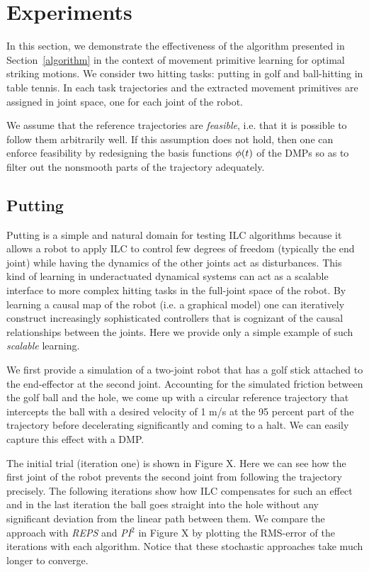 \section{Experiments}\label{experiments}

In this section, we demonstrate the effectiveness of the algorithm presented in Section~\ref{algorithm} in the context of movement primitive learning for optimal striking motions. We consider two hitting tasks: putting in golf and ball-hitting in table tennis. In each task trajectories and the extracted movement primitives are assigned in joint space, one for each joint of the robot. 

We assume that the reference trajectories are \emph{feasible}, i.e. that it is possible to follow them arbitrarily well. If this assumption does not hold, then one can enforce feasibility by redesigning the basis functions $\phi(t)$ of the DMPs so as to filter out the nonsmooth parts of the trajectory adequately.

\subsection{Putting}

Putting is a simple and natural domain for testing ILC algorithms because it allows a robot to apply ILC to control few degrees of freedom (typically the end joint) while having the dynamics of the other joints act as disturbances. This kind of learning in underactuated dynamical systems can act as a scalable interface to more complex hitting tasks in the full-joint space of the robot. By learning a causal map of the robot (i.e. a graphical model) one can iteratively construct increasingly sophisticated controllers that is cognizant of the causal relationships between the joints. Here we provide only a simple example of such \emph{scalable} learning. 

We first provide a simulation of a two-joint robot that has a golf stick attached to the end-effector at the second joint. Accounting for the simulated friction between the golf ball and the hole, we come up with a circular reference trajectory that intercepts the ball with a desired velocity of 1 m/s at the 95 percent part of the trajectory before decelerating significantly and coming to a halt. We can easily capture this effect with a DMP.

The initial trial (iteration one) is shown in Figure X. Here we can see how the first joint of the robot prevents the second joint from following the trajectory precisely. The following iterations show how ILC compensates for such an effect and in the last iteration the ball goes straight into the hole without any significant deviation from the linear path between them. We compare the approach with \emph{REPS} and \emph{PI$^{2}$} in Figure X by plotting the RMS-error of the iterations with each algorithm. Notice that these stochastic approaches take much longer to converge.

